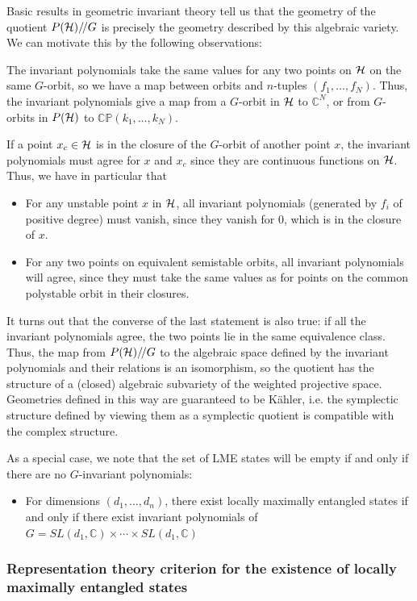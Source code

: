 \documentclass[12pt]{article}
\theoremstyle{definition}
\newcommand{\GITquot}{/\!/}
\begin{document}
Basic results in geometric invariant theory tell us that the geometry of the quotient $P({\cal H})\GITquot G$ is precisely the geometry described by this algebraic variety. We can motivate this by the following observations:

The invariant polynomials take the same values for any two points on ${\cal H}$ on the same $G$-orbit, so we have a map between orbits and $n$-tuples $(f_1,\dots,f_N)$. Thus, the invariant polynomials give a map from a $G$-orbit in ${\cal H}$ to $\mathbb{C}^N$, or from $G$-orbits in $P({\cal H})$ to $\mathbb{C P}(k_1,\dots,k_N)$.

If a point $x_c \in {\cal H}$ is in the closure of the $G$-orbit of another point $x$, the invariant polynomials must agree for $x$ and $x_c$ since they are continuous functions on ${\cal H}$. Thus, we have in particular that
\begin{itemize}
\item
For any unstable point $x$ in ${\cal H}$, all invariant polynomials (generated by $f_i$ of positive degree) must vanish, since they vanish for $0$, which is in the closure of $x$.
\item
For any two points on equivalent semistable orbits, all invariant polynomials will agree, since they must take the same values as for points on the common polystable orbit in their closures.
\end{itemize}
It turns out that the converse of the last statement is also true: if all the invariant polynomials agree, the two points lie in the same equivalence class. Thus, the map from $P({\cal H})\GITquot G$ to the algebraic space defined by the invariant polynomials and their relations is an isomorphism, so the quotient has the structure of a (closed) algebraic
subvariety of the weighted projective space. Geometries defined in this way are guaranteed to be K\"ahler, i.e. the symplectic structure defined by viewing them as a symplectic quotient is compatible with the complex structure.

As a special case, we note that the set of LME states will be empty if and only if there are no $G$-invariant polynomials:
\begin{itemize}
\item
For dimensions $(d_1, \dots, d_n)$, there exist locally maximally entangled states if and only if there exist invariant polynomials of $G = SL(d_1, \mathbb{C}) \times \cdots \times SL(d_1, \mathbb{C})$
\end{itemize}

\subsubsection*{Representation theory criterion for the existence of locally maximally entangled states}
\end{document}
